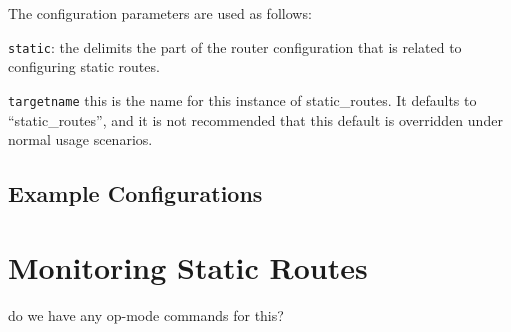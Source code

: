 \noindent
The configuration parameters are used as follows:
\begin{description}
\item{\tt static}: the delimits the part of the router configuration
  that is related to configuring static routes.
\item{\tt targetname} this is the name for this instance of static\_routes.  It
  defaults to ``{\stt static\_routes}'', and it is not recommended that this
  default is overridden under normal usage scenarios.
\end{description}


\subsection{Example Configurations}
\vspace{0.1in}
\noindent{}
\vspace{0.1in}


\section{Monitoring Static Routes}

do we have any op-mode commands for this?